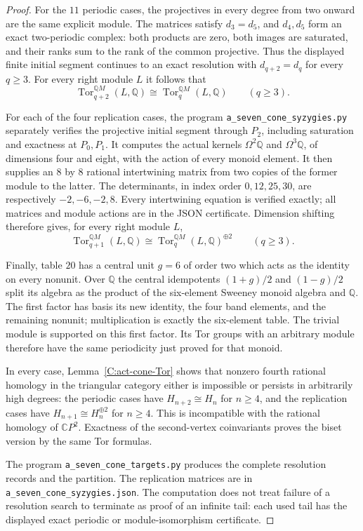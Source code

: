 \begin{proof}
For the $11$ periodic cases, the projectives in every degree from
two onward are the same explicit module. The matrices satisfy
$d_3=d_5$, and $d_4,d_5$ form an exact two-periodic complex:
both products are zero, both images are saturated, and their ranks
sum to the rank of the common projective. Thus the displayed
finite initial segment continues to an exact resolution with
$d_{q+2}=d_q$ for every $q\geq3$.
For every right module $L$ it follows that
\[
 \operatorname{Tor}_{q+2}^{\mathbb QM}(L,\mathbb Q)
 \cong\operatorname{Tor}_{q}^{\mathbb QM}(L,\mathbb Q)
 \qquad(q\geq3).
\]

For each of the four replication cases, the program
\texttt{a\_seven\_cone\_syzygies.py} separately verifies the
projective initial segment through $P_2$, including saturation
and exactness at $P_0,P_1$. It computes the actual kernels
$\Omega^2\mathbb Q$ and $\Omega^3\mathbb Q$, of dimensions
four and eight, with the action of every monoid element.
It then supplies an $8$ by $8$ rational intertwining matrix
from two copies of the former module to the latter. The
determinants, in index order $0,12,25,30$, are respectively
$-2,-6,-2,8$. Every intertwining equation is verified exactly;
all matrices and module actions are in the JSON certificate.
Dimension shifting therefore gives, for every right module $L$,
\[
 \operatorname{Tor}_{q+1}^{\mathbb QM}(L,\mathbb Q)
 \cong
 \operatorname{Tor}_{q}^{\mathbb QM}(L,\mathbb Q)^{\oplus2}
 \qquad(q\geq3).
\]

Finally, table $20$ has a central unit $g=6$ of order two which
acts as the identity on every nonunit. Over $\mathbb Q$ the
central idempotents $(1+g)/2$ and $(1-g)/2$ split its algebra
as the product of the six-element Sweeney monoid algebra and
$\mathbb Q$. The first factor has basis its new identity,
the four band elements, and the remaining nonunit; multiplication
is exactly the six-element table. The trivial module is supported
on this first factor. Its Tor groups with an arbitrary module
therefore have the same periodicity just proved for that monoid.

In every case, Lemma~\ref{C:act-cone-Tor} shows that nonzero
fourth rational homology in the triangular category either is
impossible or persists in arbitrarily high degrees: the periodic
cases have $H_{n+2}\cong H_n$ for $n\geq4$, and the replication
cases have $H_{n+1}\cong H_n^{\oplus2}$ for $n\geq4$.
This is incompatible with the rational homology of
$\mathbb CP^2$. Exactness of the second-vertex coinvariants
proves the biset version by the same Tor formulas.

The program \texttt{a\_seven\_cone\_targets.py} produces the
complete resolution records and the partition. The replication matrices
are in \texttt{a\_seven\_cone\_syzygies.json}. The computation
does not treat failure of a resolution search to terminate as
proof of an infinite tail: each used tail has the displayed
exact periodic or module-isomorphism certificate.
\end{proof}
